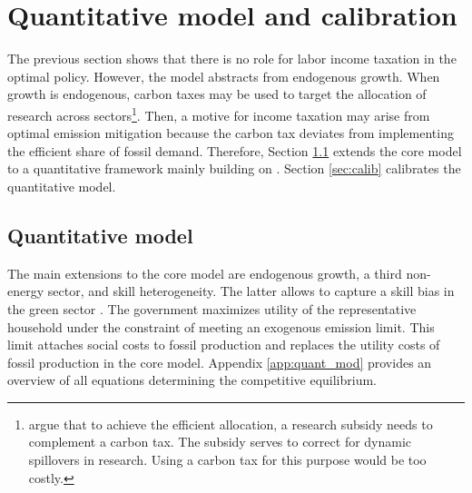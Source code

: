 \section{Quantitative model and calibration}\label{sec:model}

The previous section shows that there is no role for labor income taxation in the optimal policy. However, the model abstracts from endogenous growth. When growth is endogenous, carbon taxes may be used to target the allocation of research across sectors\footnote{ \cite{Acemoglu2012TheChange} argue that to achieve the efficient allocation, a research subsidy needs to complement a carbon tax. The subsidy serves to correct for dynamic spillovers in research. Using a carbon tax for this purpose would be too costly. }. Then, a motive for income taxation may arise from optimal emission mitigation because the carbon tax deviates from implementing the efficient share of fossil demand. 
Therefore, Section \ref{sec_quantmod} extends the core model to a quantitative framework mainly building on \cite{Fried2018ClimateAnalysis}. Section \ref{sec:calib} calibrates the quantitative model. 

\subsection{Quantitative model}\label{sec_quantmod}


The main extensions to the core model are endogenous growth, a third non-energy sector, and skill heterogeneity. The latter allows to capture a skill bias in the green sector \citep{Consoli2016DoCapital}. 
The government maximizes utility of the representative household under the constraint of meeting an exogenous emission limit. This limit attaches social costs to fossil production and replaces the utility costs of fossil production in the core model. 
Appendix \ref{app:quant_mod} provides an overview of all equations determining the competitive equilibrium.

